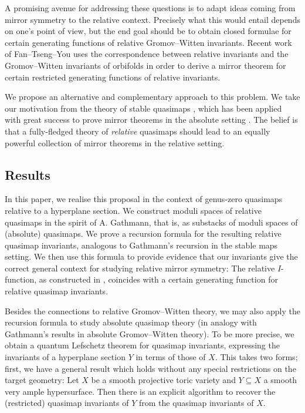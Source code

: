 \documentclass[10pt]{amsart}
\theoremstyle{definition}
\newenvironment{customthm}[1]
  {\renewcommand\theinnercustomthm{#1}\innercustomthm}
  {\endinnercustomthm}
\theoremstyle{definition}
\begin{document}
A promising avenue for addressing these questions is to adapt ideas coming from mirror symmetry to the relative context. Precisely what this would entail depends on one's point of view, but the end goal should be to obtain closed formulae for certain generating functions of relative Gromov--Witten invariants. Recent work of Fan--Tseng--You \cite{FanTsengYou} uses the correspondence between relative invariants and the Gromov--Witten invariants of orbifolds \cite{AbramovichCadmanWise} in order to derive a mirror theorem for certain restricted generating functions of relative invariants.

We propose an alternative and complementary approach to this problem. We take our motivation from the theory of stable quasimaps \cite{CF-K,CFKM}, which has been applied with great success to prove mirror theorems in the absolute setting \cite{CF-K-wallcrossing,CF-K-MirrorSymmetry}. The belief is that a fully-fledged theory of \emph{relative} quasimaps should lead to an equally powerful collection of mirror theorems in the relative setting.

\subsection{Results}
In this paper, we realise this proposal in the context of genus-zero quasimaps relative to a hyperplane section. We construct moduli spaces of relative quasimaps in the spirit of A. Gathmann, that is, as substacks of moduli spaces of (absolute) quasimaps. We prove a recursion formula for the resulting relative quasimap invariants, analogous to Gathmann's recursion \cite[\S 3]{Ga} in the stable maps setting. We then use this formula to provide evidence that our invariants give the correct general context for studying relative mirror symmetry:
\begin{customthm}{A}[\textbf{Theorem \ref{wallcrossing thm}}]\label{thmA} The relative $I$-function, as constructed in \cite{FanTsengYou}, coincides with a certain generating function for relative quasimap invariants.
\end{customthm}

Besides the connections to relative Gromov--Witten theory, we may also apply the recursion formula to study absolute quasimap theory (in analogy with Gathmann's results in absolute Gromov--Witten theory). To be more precise, we obtain a quantum Lefschetz theorem for quasimap invariants, expressing the invariants of a hyperplane section $Y$ in terms of those of $X$. This takes two forms; first, we have a general result which holds without any special restrictions on the target geometry:
\begin{customthm}{B}[\textbf{Theorem \ref{Theorem full quasimap Lefschetz}}] \label{thmB} Let $X$ be a smooth projective toric variety and $Y \subseteq X$ a smooth very ample hypersurface. Then there is an explicit algorithm to recover the (restricted) quasimap invariants of $Y$ from the quasimap invariants of $X$.\end{customthm}
\end{document}
